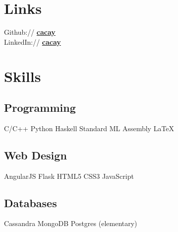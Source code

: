 \documentclass[letterpaper]{deedy-resume} %
\begin{document}
\begin{minipage}[t]{0.33\textwidth} %


\section{Links} 

Github:// \href{https://github.com/cacay}{\bf cacay} \\
LinkedIn:// \href{https://www.linkedin.com/in/cacay}{\bf cacay}

\sectionspace %


\section{Skills}

\subsection{Programming}

C/C++ \textbullet{} Python \textbullet{} Haskell \textbullet{} Standard ML \textbullet{} Assembly \textbullet{} \LaTeX\

\sectionspace %


\subsection{Web Design}

AngularJS \textbullet{} Flask \textbullet{} HTML5 \textbullet{} CSS3 \textbullet{} JavaScript

\sectionspace %


\subsection{Databases}

Cassandra \textbullet{} MongoDB \textbullet{} Postgres (elementary)


\end{minipage}
\end{document}
